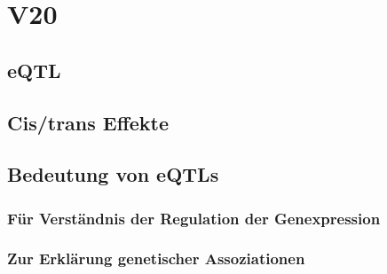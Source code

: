 \section{V20}
\subsection{eQTL}

\subsection{Cis/trans Effekte}

\subsection{Bedeutung von eQTLs}

\subsubsection{Für Verständnis der Regulation der Genexpression}

\subsubsection{Zur Erklärung genetischer Assoziationen}